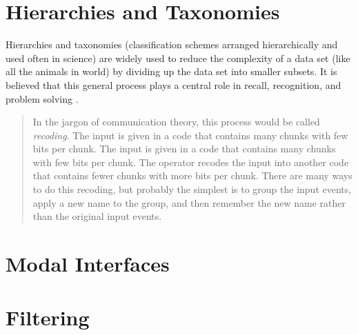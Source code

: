 \section{Hierarchies and Taxonomies}

\begin{comment}
Papers:
Magic number seven, George Miller
recoding pg. 93
increasing bits per chunk
The Structure of the Information Visualization Design Space, Section 2
enclosure
Coding Recoding Hierarchical Information
Acquisiton and forgetting of hierarchically organized information
\end{comment}

Hierarchies and taxonomies (classification schemes arranged hierarchically and used often in science) are widely used to reduce the complexity of a data set (like all the animals in world) by dividing up the data set into smaller subsets. It is believed that this general process plays a central role in recall, recognition, and problem solving \cite{seven1956}\cite{graphicalhierarchy1972}\cite{hierarchical1971}. 

\begin{quote}
In the jargon of communication theory, this process would be called \emph{recoding}. The input is given in a code that contains many chunks with few bits per chunk. The input is given in a code that contains many chunks with few bits per chunk. The operator recodes the input into another code that contains fewer chunks with more bits per chunk. There are many ways to do this recoding, but probably the simplest is to group the input events, apply a new name to the group, and then remember the new name rather than the original input events. \cite{seven1956}
\end{quote}

\section{Modal Interfaces}

\section{Filtering}

\begin{comment}
The Structure of the Information Visualization Design Space, Section 5
dynamic queries technique 

Visual Information Seeking: Tight Coupling of Dynamic Query Filters with Starfield Displays
\end{comment}
